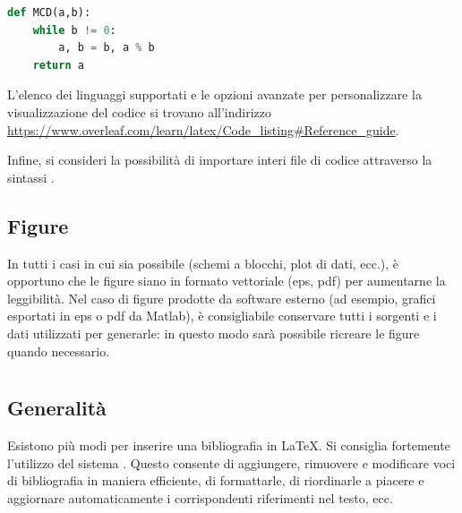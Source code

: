 \documentclass[12pt,italian]{report}
\begin{document}
\begin{lstlisting}[language=Python]
def MCD(a,b):
	while b != 0:
		a, b = b, a % b
	return a
\end{lstlisting}

L'elenco dei linguaggi supportati e le opzioni avanzate per personalizzare la visualizzazione del codice si trovano all'indirizzo \url{https://www.overleaf.com/learn/latex/Code_listing#Reference_guide}.

Infine, si consideri la possibilità di importare interi file di codice attraverso la sintassi \verb||.

\subsection{Figure}

In tutti i casi in cui sia possibile (schemi a blocchi, plot di dati, ecc.), \`e opportuno che le figure siano in formato vettoriale (eps, pdf) per aumentarne la leggibilit\`a.
Nel caso di figure prodotte da software esterno (ad esempio, grafici esportati in eps o pdf da Matlab), \`e consigliabile conservare tutti i sorgenti e i dati utilizzati per generarle: in questo modo sarà possibile ricreare le figure quando necessario.




\section{}
\label{sec:bibtex}

\subsection{Generalit\`a}

Esistono più modi per inserire una bibliografia in \LaTeX. Si consiglia fortemente l'utilizzo del sistema . Questo consente di aggiungere, rimuovere e modificare voci di bibliografia in maniera efficiente, di formattarle, di riordinarle a piacere e aggiornare automaticamente i corrispondenti riferimenti nel testo, ecc.
\end{document}
